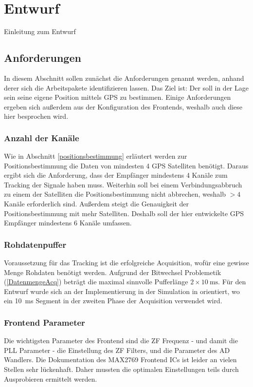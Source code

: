 \chapter{Entwurf}
Einleitung zum Entwurf

\section{Anforderungen}
In diesem Abschnitt sollen zunächst die Anforderungen genannt werden, anhand derer sich die Arbeitspakete identifizieren lassen. Das Ziel ist: Der \dscubesat soll in der Lage sein seine eigene Position mittels GPS zu bestimmen. Einige Anforderungen ergeben sich außerdem aus der Konfiguration des Frontends, weshalb auch diese hier besprochen wird.

\subsection{Anzahl der Kanäle} Wie in Abschnitt \ref{positionsbestimmung} erläutert werden zur Positionsbestimmung die Daten von mindesten 4 GPS Satelliten benötigt. Daraus ergibt sich die Anforderung, dass der Empfänger mindestens 4 Kanäle zum Tracking der Signale haben muss. Weiterhin soll bei einem Verbindungsabbruch zu einem der Satelliten die Positionsbestimmung nicht abbrechen, weshalb $>4$ Kanäle erforderlich sind. Außerdem steigt die Genauigkeit der Positionsbestimmung mit mehr Satelliten. Deshalb soll der hier entwickelte GPS Empfänger mindestens 6 Kanäle umfassen.

\subsection{Rohdatenpuffer}
Voraussetzung für das Tracking ist die erfolgreiche Acquisition, wofür eine gewisse Menge Rohdaten benötigt werden. Aufgrund der Bitwechsel Problemetik (\ref{DatenmengeAcq}) beträgt die maximal sinnvolle Pufferlänge $2\times\SI{10}{\ms}$. Für den Entwurf wurde sich an der Implementierung in der Simulation in \cite{borre2007software} orientiert, wo ein \SI{10}{\ms} Segment in der zweiten Phase der Acquisition verwendet wird.


\subsection{Frontend Parameter}
Die wichtigsten Parameter des Frontend sind die ZF Frequenz - und damit die PLL Parameter - die Einstellung des ZF Filters, und die Parameter des AD Wandlers. Die Dokumentation des MAX2769 Frontend ICs ist leider an vielen Stellen sehr lückenhaft. Daher mussten die optimalen Einstellungen teils durch Ausprobieren ermittelt werden.

